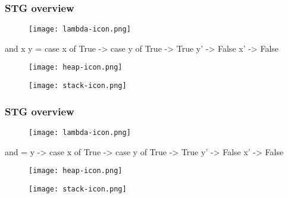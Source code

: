 \documentclass[bigger,aspectratio=169]{beamer}
\begin{document}
\begin{frame}[fragile]
\frametitle{STG overview}
\begin{center}

	\begin{minipage}{0.30\textwidth}
		\vspace{1.8cm}
		\begin{figure}
			\texttt{[image: lambda-icon.png]}
		\end{figure}
		\begin{haskellcode}
			and x y = case x of
			  True -> case y of
			    True -> True
			    y' -> False
			  x' -> False
		\end{haskellcode}
	\end{minipage}
	\hfill
	\begin{minipage}{0.30\textwidth}
		\begin{figure}
			\texttt{[image: heap-icon.png]}
		\end{figure}
	\end{minipage}
	\hfill
	\begin{minipage}{0.30\textwidth}
		\begin{figure}
			\texttt{[image: stack-icon.png]}
		\end{figure}
	\end{minipage}

\end{center}
\end{frame}

\begin{frame}[fragile]
\frametitle{STG overview}
\begin{center}

	\begin{minipage}{0.30\textwidth}
		\vspace{1.8cm}
		\begin{figure}
			\texttt{[image: lambda-icon.png]}
		\end{figure}
		\begin{haskellcode}
			and = \x y -> case x of
			  True -> case y of
			    True -> True
			    y' -> False
			  x' -> False
		\end{haskellcode}
	\end{minipage}
	\hfill
	\begin{minipage}{0.30\textwidth}
		\begin{figure}
			\texttt{[image: heap-icon.png]}
		\end{figure}
	\end{minipage}
	\hfill
	\begin{minipage}{0.30\textwidth}
		\begin{figure}
			\texttt{[image: stack-icon.png]}
		\end{figure}
	\end{minipage}

\end{center}
\end{frame}
\end{document}
